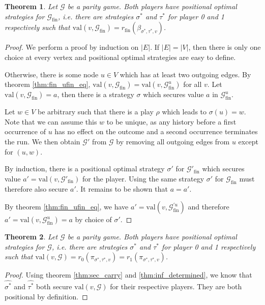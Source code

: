 \documentclass{article}
\newtheorem{theorem}{Theorem}
\begin{document}
\begin{theorem}
	Let $\mathcal{G}$ be a parity game. Both players have positional optimal strategies for $\mathcal{G}_\text{fin}$, i.e. there are strategies $\sigma^*$ and $\tau^*$ for player 0 and 1 respectively such that $\text{val}(v, \mathcal{G}_\text{fin}) = r_\text{fin}(\beta_{\sigma^*,\tau^*,v})$.
\end{theorem}
\begin{proof}
	We perform a proof by induction on $|E|$. If $|E| = |V|$, then there is only one choice at every vertex and positional optimal strategies are easy to define.
	
	Otherwise, there is some node $u \in V$ which has at least two outgoing edges. By theorem \ref{thm:fin_ufin_eq}, $\text{val}(v, \mathcal{G}_\text{fin}) = \text{val}(v, \mathcal{G}^u_\text{fin})$ for all $v$. Let $\text{val}(v, \mathcal{G}_\text{fin}) = a$, then there is a strategy $\sigma$ which secures value $a$ in $\mathcal{G}^u_\text{fin}$. 
	
	Let $w \in V$ be arbitrary such that there is a play $\rho$ which leads to $\sigma(u) = w$. Note that we can assume this $w$ to be unique, as any history before a first occurrence of $u$ has no effect on the outcome and a second occurrence terminates the run. We then obtain $\mathcal{G}'$ from $\mathcal{G}$ by removing all outgoing edges from $u$ except for $(u, w)$.
	
	By induction, there is a positional optimal strategy $\sigma'$ for $\mathcal{G}'_\text{fin}$ which secures value $a' = \text{val}(v, \mathcal{G}'_\text{fin})$ for the player. Using the same strategy $\sigma'$ for $\mathcal{G}_\text{fin}$ must therefore also secure $a'$. It remains to be shown that $a = a'$.
	
	By theorem \ref{thm:fin_ufin_eq}, we have $a' = \text{val}(v, \mathcal{G}_\text{fin}^{\prime u})$ and therefore $a' = \text{val}(v, \mathcal{G}_\text{fin}^u) = a$ by choice of $\sigma'$.
\end{proof}

\begin{theorem}
	Let $\mathcal{G}$ be a parity game. Both players have positional optimal strategies for $\mathcal{G}$, i.e. there are strategies $\sigma^*$ and $\tau^*$ for player 0 and 1 respectively such that $\text{val}(v, \mathcal{G}) = r_0(\pi_{\sigma^*,\tau^*,v}) = r_1(\pi_{\sigma^*,\tau^*,v})$.
\end{theorem}
\begin{proof}
	Using theorem \ref{thm:sec_carry} and \ref{thm:inf_determined}, we know that $\hat{\sigma^*}$ and $\hat{\tau^*}$ both secure $\text{val}(v, \mathcal{G})$ for their respective players. They are both positional by definition.
\end{proof}
\end{document}
